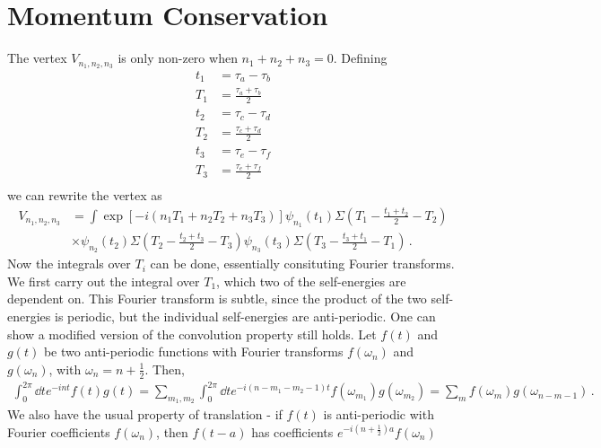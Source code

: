 \documentclass[aps,prx,preprint,onecolumn,citeautoscript,footinbib]{revtex4-1}
\begin{document}
\section{Momentum Conservation}
The vertex $V_{n_1, n_2, n_3}$ is only non-zero when  $n_1 + n_2 + n_3 = 0$. Defining 
\begin{equation*}
    \begin{aligned}
    t_1 &= \tau_a - \tau_b
    \\
    T_1 &= \frac{\tau_a + \tau_b}{2}
    \\
    t_2 &= \tau_c - \tau_d
    \\
    T_2 &= \frac{\tau_c + \tau_d}{2}
    \\
    t_3 &= \tau_e - \tau_f
    \\
    T_3 &= \frac{\tau_e + \tau_f}{2}
    \\
    \end{aligned}
\end{equation*}
we can rewrite the vertex as
\begin{equation*}
    \begin{aligned}
    V_{n_1, n_2, n_3} &= \int \exp\left[-i(n_1 T_1 + n_2 T_2 + n_3 T_3)\right] \psi_{n_1}(t_1) \Sigma\left(T_1 - \frac{t_1+t_2}{2} - T_2\right)
    \\
    &\times\psi_{n_2}(t_2)\Sigma\left(T_2 - \frac{t_2+t_3}{2} - T_3\right)\psi_{n_3}(t_3) \Sigma\left(T_3 - \frac{t_3+t_1}{2} - T_1\right)\,.
    \end{aligned}
\end{equation*}
Now the integrals over $T_i$ can be done, essentially consituting Fourier transforms. We first carry out the integral over $T_1$, which two of the self-energies are dependent on. This Fourier transform is subtle, since the product of the two self-energies is periodic, but the individual self-energies are anti-periodic. One can show a modified version of the convolution property still holds. Let $f(t)$ and $g(t)$ be two anti-periodic functions with Fourier transforms $f(\omega_n)$ and $g(\omega_n)$, with $\omega_n = n + \frac{1}{2}$. Then,
\begin{equation*}
\begin{aligned}
    \int_0^{2\pi} \dd{t} e^{-i n t} f(t) g(t) = \sum_{m_1, m_2} \int_0^{2\pi} \dd{t} e^{-i (n - m_1 - m_2 - 1)t} f(\omega_{m_1})g(\omega_{m_2}) = \sum_m f(\omega_{m})g(\omega_{n-m-1})\,.
    \end{aligned}
\end{equation*}
We also have the usual property of translation - if $f(t)$ is anti-periodic with Fourier coefficients $f(\omega_n)$, then $f(t-a)$ has coefficients $e^{-i\left(n+\frac{1}{2}\right)a}f(\omega_n)$ 
\end{document}
